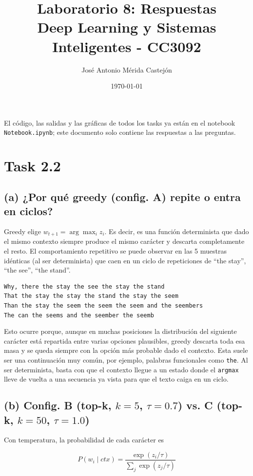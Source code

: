 \documentclass[11pt]{article}
\title{\textbf{Laboratorio 8: Respuestas} \vspace{1em}\\
  Deep Learning y Sistemas Inteligentes - CC3092}
\author{José Antonio Mérida Castejón}
\date{\today}
\begin{document}
\decimalpoint

\maketitle

El código, las salidas y las gráficas de todos los tasks ya están en el notebook \texttt{Notebook.ipynb}; este documento solo contiene las respuestas a las preguntas.

\section*{Task 2.2}

\subsection*{(a) ¿Por qué greedy (config. A) repite o entra en ciclos?}
Greedy elige \(w_{t+1}=\arg\max_i z_i\). Es decir, es una función determinista que dado el mismo contexto siempre produce el mismo carácter y descarta completamente el resto. El comportamiento repetitivo se puede observar en las 5 muestras idénticas (al ser determinista) que caen en un ciclo de repeticiones de ``the stay'', ``the see'', ``the stand''.

\begin{lstlisting}
Why, there the stay the see the stay the stand
That the stay the stay the stand the stay the seem
Than the stay the seem the seem the seem and the seembers
The can the seems and the seember the seemb
\end{lstlisting}

Esto ocurre porque, aunque en muchas posiciones la distribución del siguiente carácter está repartida entre varias opciones plausibles, greedy descarta toda esa masa y se queda siempre con la opción más probable dado el contexto. Esta suele ser una continuación muy común, por ejemplo, palabras funcionales como \texttt{the}. Al ser determinista, basta con que el contexto llegue a un estado donde el \texttt{argmax} lleve de vuelta a una secuencia ya vista para que el texto caiga en un ciclo.

\subsection*{(b) Config. B (top-k, $k=5$, $\tau=0.7$) vs. C (top-k, $k=50$, $\tau=1.0$)}
Con temperatura, la probabilidad de cada carácter es

\[P(w_i \mid ctx) = \frac{\exp(z_i/\tau)}{\sum_j \exp(z_j/\tau)}\]
\end{document}
